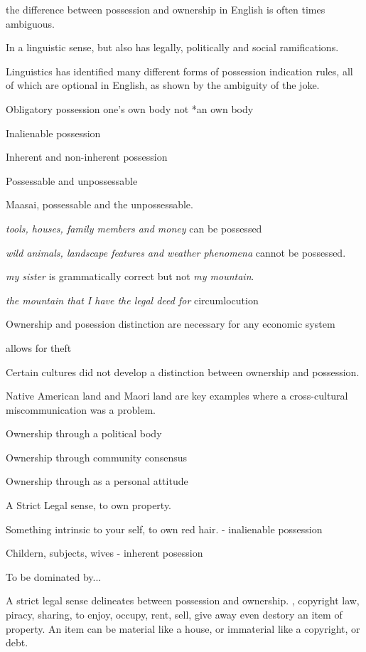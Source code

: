the difference between possession and ownership in English is often times ambiguous. 

In a linguistic sense, but also has legally, politically and social ramifications. 

Linguistics has identified many different forms of possession indication rules, all of which are optional in English, as shown by the ambiguity of the joke.

Obligatory possession
one's own body not *an own body

Inalienable possession

Inherent and non-inherent possession

Possessable and unpossessable

Maasai, possessable and the unpossessable. 

\textit{tools, houses, family members and money} can be possessed

\textit{wild animals, landscape features and weather phenomena} cannot be possessed. 

\textit{my sister} is grammatically correct but not \textit{my mountain}. 

\textit{the mountain that I have the legal deed for} circumlocution

Ownership and posession distinction are necessary for any economic system 

allows for theft

Certain cultures did not develop a distinction between ownership and possession. 

Native American land and Maori land are key examples where a cross-cultural miscommunication was a problem.

Ownership through a political body

Ownership through community consensus

Ownership through as a personal attitude

A Strict Legal sense, to own property. 

Something intrinsic to your self, to own red hair. - inalienable possession

Childern, subjects, wives - inherent posession

To be dominated by...

A strict legal sense delineates between possession and ownership. , copyright law, piracy, sharing,
to enjoy, occupy, rent, sell, give away even destory an item of property. An item can be material like a house, or immaterial like a copyright, or debt.

